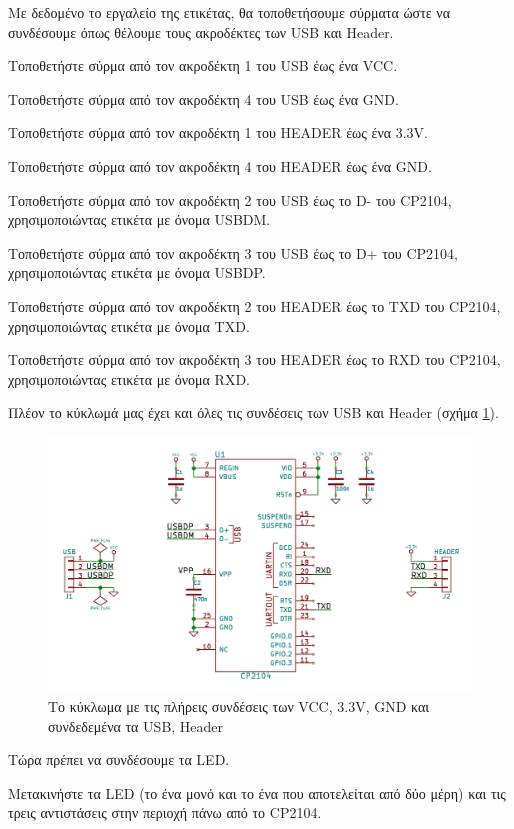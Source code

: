 \documentclass[a4paper]{article}
\begin{document}
Με δεδομένο το εργαλείο της ετικέτας, θα τοποθετήσουμε σύρματα ώστε να συνδέσουμε όπως θέλουμε τους ακροδέκτες των USB και Header.

Τοποθετήστε σύρμα από τον ακροδέκτη 1 του USB έως ένα VCC.

Τοποθετήστε σύρμα από τον ακροδέκτη 4 του USB έως ένα GND.

Τοποθετήστε σύρμα από τον ακροδέκτη 1 του HEADER έως ένα 3.3V.

Τοποθετήστε σύρμα από τον ακροδέκτη 4 του HEADER έως ένα GND.

Τοποθετήστε σύρμα από τον ακροδέκτη 2 του USB έως το D- του CP2104, χρησιμοποιώντας ετικέτα με όνομα USBDM.

Τοποθετήστε σύρμα από τον ακροδέκτη 3 του USB έως το D+ του CP2104, χρησιμοποιώντας ετικέτα με όνομα USBDP.

Τοποθετήστε σύρμα από τον ακροδέκτη 2 του HEADER έως το TXD του CP2104, χρησιμοποιώντας ετικέτα με όνομα TXD.

Τοποθετήστε σύρμα από τον ακροδέκτη 3 του HEADER έως το RXD του CP2104, χρησιμοποιώντας ετικέτα με όνομα RXD.

Πλέον το κύκλωμά μας έχει και όλες τις συνδέσεις των USB και Header (σχήμα \ref{fig:eesch-circ-allpwrheaders}).

\begin{figure}
  \begin{center}
    \includegraphics[width=.9\textwidth]{img/eesch-circ-allpwrheaders.png}
    \caption{Το κύκλωμα με τις πλήρεις συνδέσεις των VCC, 3.3V, GND και συνδεδεμένα τα USB, Header}
    \label{fig:eesch-circ-allpwrheaders}
  \end{center}
\end{figure}

Τώρα πρέπει να συνδέσουμε τα LED. 

Μετακινήστε τα LED (το ένα μονό και το ένα που αποτελείται από δύο μέρη) και τις τρεις αντιστάσεις στην περιοχή πάνω από το CP2104.
\end{document}
